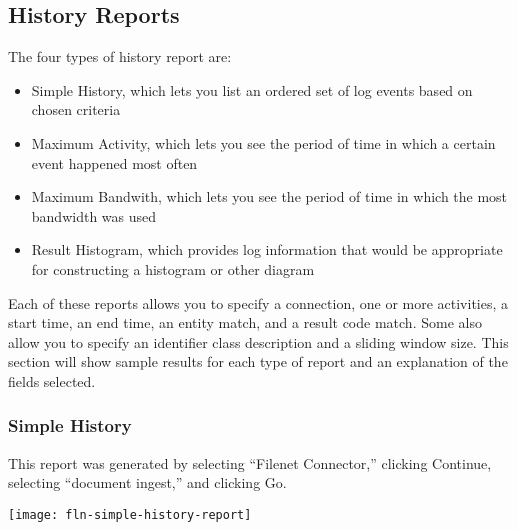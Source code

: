 \begin{changemargin}{1.5in}{0in}


\subsection{History Reports}

The four types of history report are:

\begin{itemize}

\item Simple History, which lets you list an ordered set of log events
based on chosen criteria

\item Maximum Activity, which lets you see the period of time in
which a certain event happened most often

\item Maximum Bandwith, which lets you see the period of time in
which the most bandwidth was used 

\item Result Histogram, which provides log information that would be
appropriate for constructing a histogram or other diagram

\end{itemize}

Each of these reports allows you to specify a connection, one or more
activities, a start time, an end time, an entity match, and a result code
match.  Some also allow you to specify an identifier class description
and a sliding window size. This section will show sample results for
each type of report and an explanation of the fields selected.

\subsubsection{Simple History}

This report was generated by selecting ``Filenet Connector,'' 
clicking Continue, selecting ``document ingest,'' and clicking Go.

\texttt{[image: fln-simple-history-report]}


\end{changemargin}
